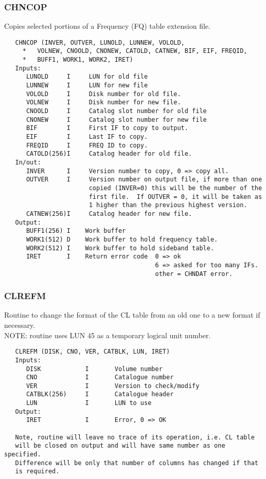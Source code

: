 \subsubsection{CHNCOP}
Copies selected portions of a Frequency (FQ) table extension
file.
\begin{verbatim}
   CHNCOP (INVER, OUTVER, LUNOLD, LUNNEW, VOLOLD,
     *   VOLNEW, CNOOLD, CNONEW, CATOLD, CATNEW, BIF, EIF, FREQID,
     *   BUFF1, WORK1, WORK2, IRET)
   Inputs:
      LUNOLD     I     LUN for old file
      LUNNEW     I     LUN for new file
      VOLOLD     I     Disk number for old file.
      VOLNEW     I     Disk number for new file.
      CNOOLD     I     Catalog slot number for old file
      CNONEW     I     Catalog slot number for new file
      BIF        I     First IF to copy to output.
      EIF        I     Last IF to copy.
      FREQID     I     FREQ ID to copy.
      CATOLD(256)I     Catalog header for old file.
   In/out:
      INVER      I     Version number to copy, 0 => copy all.
      OUTVER     I     Version number on output file, if more than one
                       copied (INVER=0) this will be the number of the
                       first file.  If OUTVER = 0, it will be taken as
                       1 higher than the previous highest version.
      CATNEW(256)I     Catalog header for new file.
   Output:
      BUFF1(256) I    Work buffer
      WORK1(512) D    Work buffer to hold frequency table.
      WORK2(512) I    Work buffer to hold sideband table.
      IRET       I    Return error code  0 => ok
                                         6 => asked for too many IFs.
                                         other = CHNDAT error.
\end{verbatim}

\subsubsection{CLREFM}
Routine to change the format of the CL table from an old one to a new
format if necessary.\\
NOTE: routine uses LUN 45 as a temporary logical unit number.
\begin{verbatim}
   CLREFM (DISK, CNO, VER, CATBLK, LUN, IRET)
   Inputs:
      DISK            I       Volume number
      CNO             I       Catalogue number
      VER             I       Version to check/modify
      CATBLK(256)     I       Catalogue header
      LUN             I       LUN to use
   Output:
      IRET            I       Error, 0 => OK

   Note, routine will leave no trace of its operation, i.e. CL table
   will be closed on output and will have same number as one specified.
   Difference will be only that number of columns has changed if that
   is required.
\end{verbatim}

